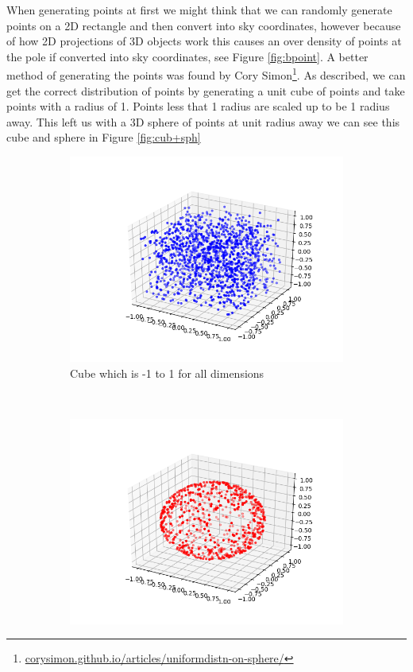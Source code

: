 \documentclass[a4paper]{article}
\begin{document}
When generating points at first we might think that we can randomly generate points on a 2D rectangle and then convert into sky coordinates, however because of how 2D projections of 3D objects work this causes an over density of points at the pole if converted into sky coordinates, see Figure \ref{fig:bpoint}. A better method of generating the points was found by Cory Simon\footnote{\url{corysimon.github.io/articles/uniformdistn-on-sphere/}}. As described, we can get the correct distribution of points by generating a unit cube of points and take points with a radius of 1. Points less that 1 radius are scaled up to be 1 radius away. This left us with a 3D sphere of points at unit radius away we can see this cube and sphere in Figure \ref{fig:cub+sph}
\begin{figure}[H]
    \centering
    \begin{subfigure}[t]{0.5\textwidth}
        \centering
        \includegraphics[width=\textwidth, right]{cube1.png}
        \caption{Cube which is -1 to 1 for all dimensions}
    \end{subfigure}%
    ~ 
    \begin{subfigure}[t]{0.5\textwidth}
        \centering
        \includegraphics[width=\textwidth, left]{sphere1.png}

\end{subfigure}
\end{figure}
\end{document}

